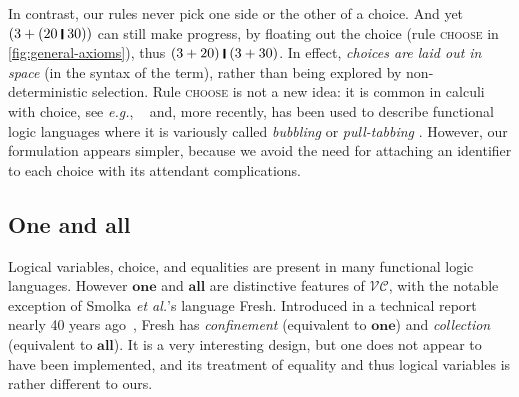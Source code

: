 \documentclass[acmsmall,review,dvipsnames]{acmart}
\newcommand{\eg}{\emph{e.g.}}
\newcommand{\etal}{\emph{et al.}}
\newcommand{\versecalc}{$\mathcal{VC}$}
\newcommand{\rulename}[1]{\textsc{\small #1}}
\begin{document}
In contrast, our rules never pick one side or the other of a choice.
And yet \ensuremath{(\mathrm{3}\mathbin{+}(\mathrm{20}\;\rule[-0.3mm]{0.5mm}{2.5mm}\;\mathrm{30}))} can still make progress, by floating out the
choice (rule \rulename{choose} in \cref{fig:general-axioms}), thus
\ensuremath{(\mathrm{3}\mathbin{+}\mathrm{20})\;\rule[-0.3mm]{0.5mm}{2.5mm}\;(\mathrm{3}\mathbin{+}\mathrm{30})}.  In effect, \emph{choices are laid out in space} (in
the syntax of the term), rather than being explored by
non-deterministic selection.  Rule \rulename{choose} is not a new idea:
it is common in calculi with choice, see {\eg}, ~\citetext{\citealp[Section 6.1]{liguoro:non-det}, \citealp[Section 3]{lago:probabilistic}}
and, more recently, has been used to describe functional logic languages where it is variously
called \emph{bubbling} \cite{antoy:bubbling} or \emph{pull-tabbing} \cite{antoy:pull-tabbing}.
However, our formulation appears simpler, because we avoid the need for attaching
an identifier to each choice with its attendant complications.

\subsection{One and all}

Logical variables, choice, and equalities are present in many functional logic
languages.  However \ensuremath{\textbf{one}} and \ensuremath{\textbf{all}} are distinctive features of \versecalc{},
with the notable exception of Smolka {\etal}'s language Fresh.
Introduced in a technical report nearly 40 years ago~\cite{smolka:fresh},
Fresh has \emph{confinement} (equivalent to \ensuremath{\textbf{one}}) and \emph{collection} (equivalent to \ensuremath{\textbf{all}}).
It is a very interesting design, but one does not appear to have been implemented,
and its treatment of equality and thus logical variables is rather different to ours.
\end{document}
